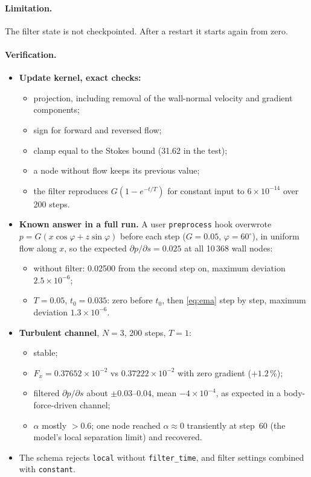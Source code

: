 \documentclass[11pt,a4paper]{article}
\newcommand{\code}[1]{\texttt{#1}}
\newcommand{\dpds}{\partial p/\partial s}
\begin{document}
\paragraph{Limitation.} The filter state is not checkpointed. After a
restart it starts again from zero.

\paragraph{Verification.}
\begin{itemize}
  \item \textbf{Update kernel, exact checks:}
    \begin{itemize}
      \item projection, including removal of the wall-normal velocity and
        gradient components;
      \item sign for forward and reversed flow;
      \item clamp equal to the Stokes bound (31.62 in the test);
      \item a node without flow keeps its previous value;
      \item the filter reproduces $G(1-e^{-t/T})$ for constant input to
        $6\times10^{-14}$ over 200 steps.
    \end{itemize}
  \item \textbf{Known answer in a full run.} A user \code{preprocess} hook
    overwrote $p = G(x\cos\varphi + z\sin\varphi)$ before each step
    ($G = 0.05$, $\varphi = 60^\circ$), in uniform flow along $x$, so the
    expected $\dpds = 0.025$ at all 10\,368 wall nodes:
    \begin{itemize}
      \item without filter: 0.02500 from the second step on, maximum
        deviation $2.5\times10^{-6}$;
      \item $T = 0.05$, $t_0 = 0.035$: zero before $t_0$, then
        \eqref{eq:ema} step by step, maximum deviation
        $1.3\times10^{-6}$.
    \end{itemize}
  \item \textbf{Turbulent channel}, $N=3$, 200 steps, $T=1$:
    \begin{itemize}
      \item stable;
      \item $F_x = 0.37652\times10^{-2}$ vs $0.37222\times10^{-2}$ with zero
        gradient ($+1.2$\,\%);
      \item filtered $\dpds$ about $\pm0.03$--$0.04$, mean
        $-4\times10^{-4}$, as expected in a body-force-driven channel;
      \item $\alpha$ mostly $> 0.6$; one node reached $\alpha\approx0$
        transiently at step~60 (the model's local separation limit) and
        recovered.
    \end{itemize}
  \item The schema rejects \code{local} without \code{filter\_time}, and
    filter settings combined with \code{constant}.
\end{itemize}
\end{document}
